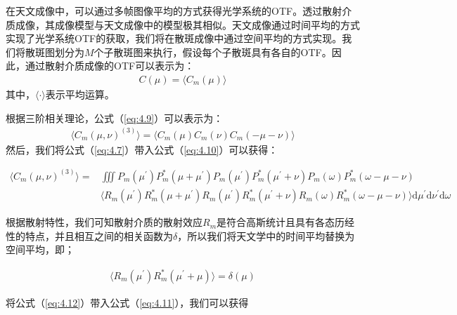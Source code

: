 在天文成像中，可以通过多帧图像平均的方式获得光学系统的OTF。透过散射介质成像，其成像模型与天文成像中的模型极其相似。天文成像通过时间平均的方式实现了光学系统OTF的获取，我们将在散斑成像中通过空间平均的方式实现。我们将散斑图划分为$M$个子散斑图来执行，假设每个子散斑具有各自的OTF。因此，通过散射介质成像的OTF可以表示为：
\begin{equation}
\begin{aligned}
    C(\mu) = \langle C_m(\mu)  \rangle
\end{aligned}
\label{eq:4.9}
\end{equation}其中，$\langle \cdot  \rangle$表示平均运算。

根据三阶相关理论\cite{lohmann_speckle_1983,northcott_algorithms_1988}，公式（\ref{eq:4.9}）可以表示为：
\begin{equation}
\begin{aligned}
    \langle C_m(\mu,\nu)^{(3)} \rangle= \langle C_m(\mu) C_m(\nu) C_m(-\mu-\nu)  \rangle
\end{aligned}
\label{eq:4.10}
\end{equation}然后，我们将公式（\ref{eq:4.7}）带入公式（\ref{eq:4.10}）可以获得：

\begin{equation}
\begin{aligned}
    \langle C_m(\mu,\nu)^{(3)} \rangle= &\iiint P_{m}(\mu^{\prime}) P_{m}^{*}(\mu + \mu^{\prime}) P_{m}(\mu^{\prime}) P_{m}^{*}(\mu^{\prime} + \nu) P_{m}(\omega) P_{m}^{*}(\omega -\mu - \nu) \\ &\langle R_{m}(\mu^{\prime}) R_{m}^{*}(\mu + \mu^{\prime}) R_{m}(\mu^{\prime}) R_{m}^{*}(\mu^{\prime} + \nu) R_{m}(\omega) R_{m}^{*}(\omega -\mu - \nu) \rangle \mathrm{d}{\mu^{\prime}} \mathrm{d}{\nu^{\prime}} \mathrm{d}{\omega}
\end{aligned}
\label{eq:4.11}
\end{equation}

根据散射特性，我们可知散射介质的散射效应$R_{m}$是符合高斯统计且具有各态历经性的特点，并且相互之间的相关函数为$\delta$，所以我们将天文学中的时间平均替换为空间平均，即；

\begin{equation}
\begin{aligned}
    \langle R_{m}(\mu^{\prime}) R_{m}^{*}(\mu^{\prime}+\mu) \rangle= \delta(\mu)
\end{aligned}
\label{eq:4.12}
\end{equation}

将公式（\ref{eq:4.12}）带入公式（\ref{eq:4.11}），我们可以获得

